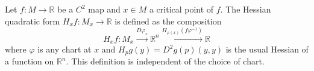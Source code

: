 Let $f: M \to \mathbb{R}$ be a $C^2$ map and $x \in M$ a critical point of $f$. The Hessian quadratic form $H_x f: M_x \to \mathbb{R}$ is defined as the composition
$$H_x f: M_x \xrightarrow{D\varphi_x} \mathbb{R}^n \xrightarrow{H_{\varphi(x)}(f\varphi^{-1})} \mathbb{R}$$
where $\varphi$ is any chart at $x$ and $H_p g(y) = D^2 g(p)(y, y)$ is the usual Hessian of a function on $\mathbb{R}^n$. This definition is independent of the choice of chart.
